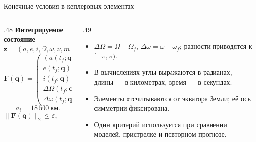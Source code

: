 \documentclass[11pt,aspectratio=169,t]{beamer}
\newcommand{\eqcompact}{\fontsize{10}{12}\selectfont}
\newcommand{\derivationmathspacing}{%
  \setlength{\abovedisplayskip}{2pt}%
  \setlength{\belowdisplayskip}{3pt}%
  \setlength{\abovedisplayshortskip}{2pt}%
  \setlength{\belowdisplayshortskip}{2pt}%
  \setlength{\jot}{2pt}}
\newcommand{\vect}[1]{\boldsymbol{#1}}
\begin{document}
\begin{frame}{Конечные условия в кеплеровых элементах}
\relax
\derivationmathspacing
\begin{columns}[T,onlytextwidth]
\begin{column}{.48\textwidth}
\textbf{Интегрируемое состояние}
\[
 \vect z=(a,e,i,\Omega,\omega,\nu,m)^\top.
\]
{\eqcompact\derivationmathspacing
\[
 \vect F(\vect q)=
 \begin{pmatrix}
 (a(t_f;\vect q)-a_f)/a_i\\
 e(t_f;\vect q)-e_f\\
 i(t_f;\vect q)-i_f\\
 \Delta\Omega(t_f;\vect q)\\
 \Delta\omega(t_f;\vect q)
 \end{pmatrix},
\]
\[
 a_i=18\,500\ \text{км}.
\]
}
\[
 \boxed{\lVert\vect F(\vect q)\rVert_2\leqslant\varepsilon,
 \qquad\varepsilon=10^{-8}.}
\]
\end{column}
\begin{column}{.49\textwidth}
\begin{itemize}
\setlength{\itemsep}{5pt}
\item $\Delta\Omega=\Omega-\Omega_f$, $\Delta\omega=\omega-\omega_f$;
разности приводятся к $[-\pi,\pi)$.
\item В вычислениях углы выражаются в радианах, длины --- в километрах,
время --- в секундах.
\item Элементы отсчитываются от экватора Земли; её ось симметрии фиксирована.
\item Один критерий используется при сравнении моделей,
пристрелке и повторном прогнозе.
\end{itemize}
\end{column}
\end{columns}
\end{frame}
\end{document}
